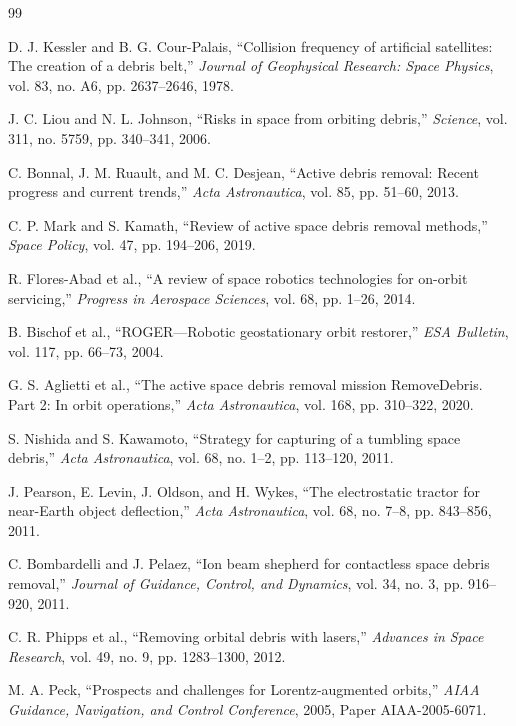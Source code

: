 \documentclass[12pt,a4paper]{article}
\begin{document}
\begin{thebibliography}{99}

D. J. Kessler and B. G. Cour-Palais,
``Collision frequency of artificial satellites: The creation of a debris belt,''
\textit{Journal of Geophysical Research: Space Physics}, vol. 83, no. A6, pp. 2637--2646, 1978.

J. C. Liou and N. L. Johnson,
``Risks in space from orbiting debris,''
\textit{Science}, vol. 311, no. 5759, pp. 340--341, 2006.

C. Bonnal, J. M. Ruault, and M. C. Desjean,
``Active debris removal: Recent progress and current trends,''
\textit{Acta Astronautica}, vol. 85, pp. 51--60, 2013.

C. P. Mark and S. Kamath,
``Review of active space debris removal methods,''
\textit{Space Policy}, vol. 47, pp. 194--206, 2019.

R. Flores-Abad et al.,
``A review of space robotics technologies for on-orbit servicing,''
\textit{Progress in Aerospace Sciences}, vol. 68, pp. 1--26, 2014.

B. Bischof et al.,
``ROGER—Robotic geostationary orbit restorer,''
\textit{ESA Bulletin}, vol. 117, pp. 66--73, 2004.

G. S. Aglietti et al.,
``The active space debris removal mission RemoveDebris. Part 2: In orbit operations,''
\textit{Acta Astronautica}, vol. 168, pp. 310--322, 2020.

S. Nishida and S. Kawamoto,
``Strategy for capturing of a tumbling space debris,''
\textit{Acta Astronautica}, vol. 68, no. 1--2, pp. 113--120, 2011.

J. Pearson, E. Levin, J. Oldson, and H. Wykes,
``The electrostatic tractor for near-Earth object deflection,''
\textit{Acta Astronautica}, vol. 68, no. 7--8, pp. 843--856, 2011.

C. Bombardelli and J. Pelaez,
``Ion beam shepherd for contactless space debris removal,''
\textit{Journal of Guidance, Control, and Dynamics}, vol. 34, no. 3, pp. 916--920, 2011.

C. R. Phipps et al.,
``Removing orbital debris with lasers,''
\textit{Advances in Space Research}, vol. 49, no. 9, pp. 1283--1300, 2012.

M. A. Peck,
``Prospects and challenges for Lorentz-augmented orbits,''
\textit{AIAA Guidance, Navigation, and Control Conference}, 2005, Paper AIAA-2005-6071.


\end{thebibliography}
\end{document}
